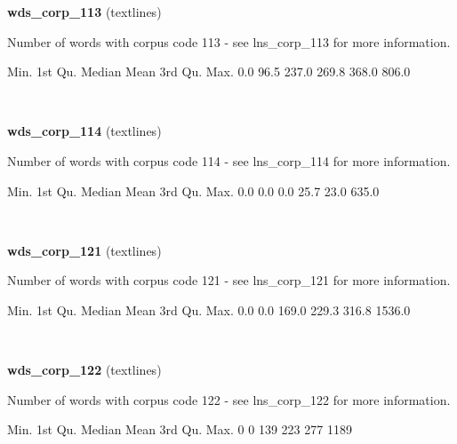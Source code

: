 \documentclass[]{article}
\newenvironment{Shaded}{\begin{snugshade}}{\end{snugshade}}
\newcommand{\DecValTok}[1]{\textcolor[rgb]{0.00,0.00,0.81}{{#1}}}
\newcommand{\FloatTok}[1]{\textcolor[rgb]{0.00,0.00,0.81}{{#1}}}
\newcommand{\NormalTok}[1]{{#1}}
\begin{document}
\textbf{wds\_corp\_113} (textlines)

Number of words with corpus code 113 - see lns\_corp\_113 for more
information.

\begin{Shaded}
\begin{Highlighting}[]
   \NormalTok{Min. 1st Qu.  Median    Mean 3rd Qu.    Max. }
    \FloatTok{0.0}    \FloatTok{96.5}   \FloatTok{237.0}   \FloatTok{269.8}   \FloatTok{368.0}   \FloatTok{806.0} 
\end{Highlighting}
\end{Shaded}

~

\vspace{1em}

\textbf{wds\_corp\_114} (textlines)

Number of words with corpus code 114 - see lns\_corp\_114 for more
information.

\begin{Shaded}
\begin{Highlighting}[]
   \NormalTok{Min. 1st Qu.  Median    Mean 3rd Qu.    Max. }
    \FloatTok{0.0}     \FloatTok{0.0}     \FloatTok{0.0}    \FloatTok{25.7}    \FloatTok{23.0}   \FloatTok{635.0} 
\end{Highlighting}
\end{Shaded}

~

\vspace{1em}

\textbf{wds\_corp\_121} (textlines)

Number of words with corpus code 121 - see lns\_corp\_121 for more
information.

\begin{Shaded}
\begin{Highlighting}[]
   \NormalTok{Min. 1st Qu.  Median    Mean 3rd Qu.    Max. }
    \FloatTok{0.0}     \FloatTok{0.0}   \FloatTok{169.0}   \FloatTok{229.3}   \FloatTok{316.8}  \FloatTok{1536.0} 
\end{Highlighting}
\end{Shaded}

~

\vspace{1em}

\textbf{wds\_corp\_122} (textlines)

Number of words with corpus code 122 - see lns\_corp\_122 for more
information.

\begin{Shaded}
\begin{Highlighting}[]
   \NormalTok{Min. 1st Qu.  Median    Mean 3rd Qu.    Max. }
      \DecValTok{0}       \DecValTok{0}     \DecValTok{139}     \DecValTok{223}     \DecValTok{277}    \DecValTok{1189} 
\end{Highlighting}
\end{Shaded}
\end{document}
